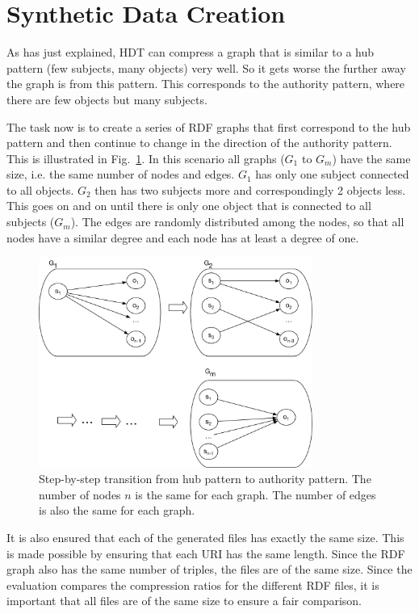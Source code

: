 \section{Synthetic Data Creation}\label{sec:data_creation}

As has just explained, HDT can compress a graph that is similar to a hub pattern (few subjects, many objects) very well. So it gets worse the further away the graph is from this pattern. This corresponds to the authority pattern, where there are few objects but many subjects.

The task now is to create a series of RDF graphs that first correspond to the hub pattern and then continue to change in the direction of the authority pattern. This is illustrated in Fig.~\ref{fig:star_pattern}. In this scenario all graphs ($G_1$ to $G_m$) have the same size, i.e. the same number of nodes and edges. $G_1$ has only one subject connected to all objects. $G_2$ then has two subjects more and correspondingly 2 objects less. This goes on and on until there is only one object that is connected to all subjects ($G_m$). The edges are randomly distributed among the nodes, so that all nodes have a similar degree and each node has at least a degree of one.

\begin{figure}[h]
	\centering
	\includegraphics[width=0.8\textwidth]{figures/GRPvsHDT/starpattern.pdf}
	\caption{Step-by-step transition from hub pattern to authority pattern. The number of nodes $n$ is the same for each graph. The number of edges is also the same for each graph.}
	\label{fig:star_pattern}
\end{figure}

It is also ensured that each of the generated files has exactly the same size. This is made possible by ensuring that each URI has the same length. Since the RDF graph also has the same number of triples, the files are of the same size. Since the evaluation compares the compression ratios for the different RDF files, it is important that all files are of the same size to ensure a fair comparison.

